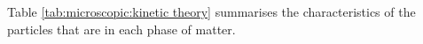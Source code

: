       \label{m38730*id308767}Table \ref{tab:microscopic:kinetic theory} summarises the characteristics of the particles that are in each phase of matter.\par 
